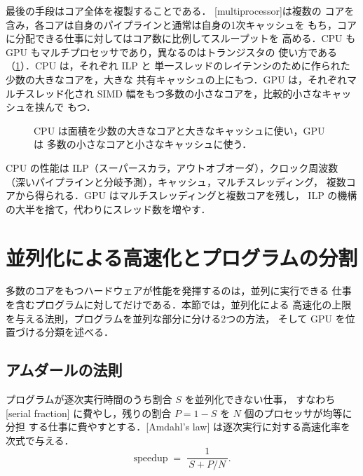\documentclass[../main.tex]{subfiles}
\begin{document}
最後の手段はコア全体を複製することである．
[multiprocessor]は複数の
コアを含み，各コアは自身のパイプラインと通常は自身の1次キャッシュを
もち，コアに分配できる仕事に対してはコア数に比例してスループットを
高める．CPU も GPU もマルチプロセッサであり，異なるのはトランジスタの
使い方である（\cref{fig:l01-cpu-vs-gpu}）．CPU は，それぞれ ILP と
単一スレッドのレイテンシのために作られた少数の大きなコアを，大きな
共有キャッシュの上にもつ．GPU は，それぞれマルチスレッド化され SIMD
幅をもつ多数の小さなコアを，比較的小さなキャッシュを挟んで
もつ．

\begin{figure}[htbp]
  \centering
  
  \caption{CPU は面積を少数の大きなコアと大きなキャッシュに使い，GPU は
    多数の小さなコアと小さなキャッシュに使う．}
  \label{fig:l01-cpu-vs-gpu}
\end{figure}

\begin{keypoint}
  CPU の性能は ILP（スーパースカラ，アウトオブオーダ），クロック周波数
  （深いパイプラインと分岐予測），キャッシュ，マルチスレッディング，
  複数コアから得られる．GPU はマルチスレッディングと複数コアを残し，
  ILP の機構の大半を捨て，代わりにスレッド数を増やす．
\end{keypoint}

\section{並列化による高速化とプログラムの分割}
\label{sec:l01-parallel-programs}

多数のコアをもつハードウェアが性能を発揮するのは，並列に実行できる
仕事を含むプログラムに対してだけである．本節では，並列化による
高速化の上限を与える法則，プログラムを並列な部分に分ける2つの方法，
そして GPU を位置づける分類を述べる．

\subsection{アムダールの法則}

\begin{definition}[アムダールの法則]
  \label{def:l01-amdahl}
  プログラムが逐次実行時間のうち割合 $S$ を並列化できない仕事，
  すなわち[serial fraction]
  に費やし，残りの割合 $P = 1 - S$ を $N$ 個のプロセッサが均等に分担
  する仕事に費やすとする．[Amdahl's law]
  は逐次実行に対する高速化率を次式で与える．
  \begin{equation}
    \text{speedup} \;=\; \frac{1}{\,S + P/N\,}.
    \label{eq:l01-amdahl}
  \end{equation}
\end{definition}
\end{document}
